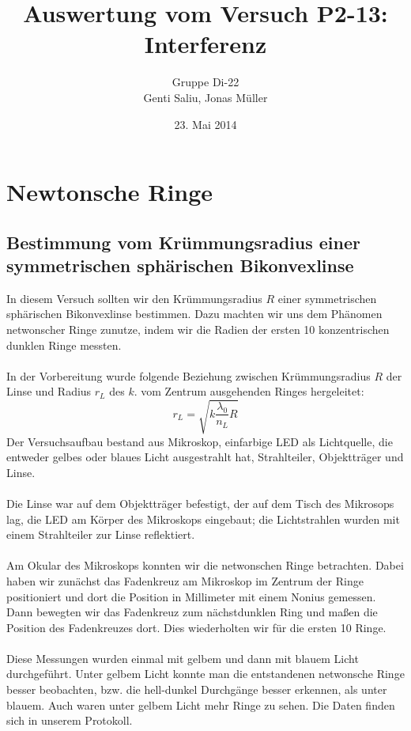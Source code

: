 \documentclass[a4paper,titlepage]{scrartcl}
\title{Auswertung vom Versuch P2-13: Interferenz}
\author{Gruppe Di-22\\Genti Saliu, Jonas Müller}
\date{23. Mai 2014}
\numberwithin{equation}{section}
\begin{document}
\begin{titlepage}
\maketitle
\thispagestyle{empty}
\end{titlepage}

\newpage
{}
\tableofcontents

\newpage
{}

\section{Newtonsche Ringe}
\subsection{Bestimmung vom Krümmungsradius einer symmetrischen sphärischen Bikonvexlinse}
In diesem Versuch sollten wir den Krümmungsradius $R$ einer symmetrischen sphärischen Bikonvexlinse bestimmen. Dazu machten wir uns dem Phänomen netwonscher Ringe zunutze, indem wir die Radien der ersten 10 konzentrischen dunklen Ringe messten.\\ \\
In der Vorbereitung wurde folgende Beziehung zwischen Krümmungsradius $R$ der Linse und Radius $r_L$ des $k.$ vom Zentrum ausgehenden Ringes hergeleitet:
\begin{equation*}
r_L=\sqrt{k \frac{\lambda_0}{n_L}R}
\end{equation*}
Der Versuchsaufbau bestand aus Mikroskop, einfarbige LED als Lichtquelle, die entweder gelbes oder blaues Licht ausgestrahlt hat, Strahlteiler, Objektträger und Linse.\\ \\
Die Linse war auf dem Objektträger befestigt, der auf dem Tisch des Mikrosops lag, die LED am Körper des Mikroskops eingebaut; die Lichtstrahlen wurden mit einem Strahlteiler zur Linse reflektiert. \\ \\
Am Okular des Mikroskops konnten wir die netwonschen Ringe betrachten. Dabei haben wir zunächst das Fadenkreuz am Mikroskop im Zentrum der Ringe positioniert und dort die Position in Millimeter mit einem Nonius gemessen. Dann bewegten wir das Fadenkreuz zum nächstdunklen Ring und maßen die Position des Fadenkreuzes dort. Dies wiederholten wir für die ersten 10 Ringe.\\ \\
Diese Messungen wurden einmal mit gelbem und dann mit blauem Licht durchgeführt. Unter gelbem Licht konnte man die entstandenen netwonsche Ringe besser beobachten, bzw. die hell-dunkel Durchgänge besser erkennen, als unter blauem. Auch waren unter gelbem Licht mehr Ringe zu sehen. Die Daten finden sich in unserem Protokoll.\\ \\
\end{document}
